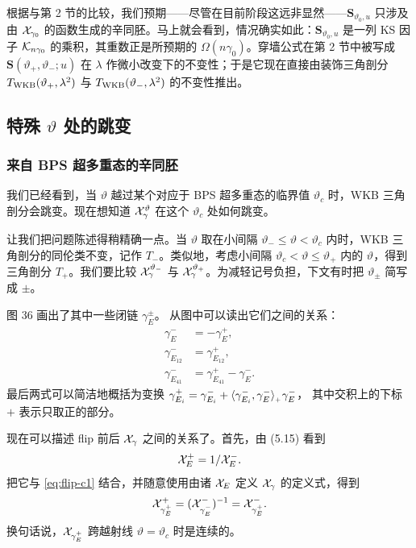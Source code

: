 根据与第 2 节的比较，我们预期——尽管在目前阶段这远非显然——$\mathbf{S}_{\vartheta_0,u}$ 只涉及由 $\mathcal{X}_{\gamma_0}$ 的函数生成的辛同胚。马上就会看到，情况确实如此：$\mathbf{S}_{\vartheta_0,u}$ 是一列 KS 因子 $\mathcal{K}_{n\gamma_0}$ 的乘积，其重数正是所预期的 $\Omega(n\gamma_0)$。穿墙公式在第 2 节中被写成 $\mathbf{S}(\vartheta_+,\vartheta_-;u)$ 在 $\lambda$ 作微小改变下的不变性；于是它现在直接由装饰三角剖分 $T_{\rm WKB}(\vartheta_+,\lambda^2)$ 与 $T_{\rm WKB}(\vartheta_-,\lambda^2)$ 的不变性推出。

\subsection{特殊 $\vartheta$ 处的跳变}

\subsubsection{来自 BPS 超多重态的辛同胚}

我们已经看到，当 $\vartheta$ 越过某个对应于 BPS 超多重态的临界值 $\vartheta_c$ 时，WKB 三角剖分会跳变。现在想知道 $\mathcal{X}^\vartheta_\gamma$ 在这个 $\vartheta_c$ 处如何跳变。

让我们把问题陈述得稍精确一点。当 $\vartheta$ 取在小间隔 $\vartheta_-\le\vartheta<\vartheta_c$ 内时，WKB 三角剖分的同伦类不变，记作 $T_-$。类似地，考虑小间隔 $\vartheta_c<\vartheta\le\vartheta_+$ 内的 $\vartheta$，得到三角剖分 $T_+$。我们要比较 $\mathcal{X}^{\vartheta_-}_\gamma$ 与 $\mathcal{X}^{\vartheta_+}_\gamma$。为减轻记号负担，下文有时把 $\vartheta_\pm$ 简写成 $\pm$。


图 36 画出了其中一些闭链 $\gamma^\pm_E$。%
从图中可以读出它们之间的关系：
%
\begin{align}
\gamma_E^{-} &= - \gamma_E^{+}, \label{eq:flip-c1} \\
\gamma_{E_{12}}^{-} &= \gamma_{E_{12}}^{+}, \label{eq:flip-c2} \\
\gamma_{E_{41}}^{-} &= \gamma_{E_{41}}^{+} - \gamma_E^{-}. \label{eq:flip-c3}
\end{align}
%
最后两式可以简洁地概括为变换
$\gamma_{E_i}^+ = \gamma_{E_i}^- + \langle \gamma_{E_i}^-, \gamma_E^- \rangle_{{}_+} \gamma_E^-$，
其中交积上的下标 $+$ 表示只取正的部分。

现在可以描述 flip 前后 $\mathcal{X}_\gamma$ 之间的关系了。首先，由 (5.15)%
看到
\begin{equation}
\mathcal{X}^+_E = 1/\mathcal{X}^-_E.
\end{equation}
把它与 \eqref{eq:flip-c1} 结合，并随意使用由诸 $\mathcal{X}_E$ 定义 $\mathcal{X}_\gamma$ 的定义式，得到
\begin{equation}
\mathcal{X}^+_{\gamma_E^+} = (\mathcal{X}^-_{\gamma_E^-})^{-1} = \mathcal{X}^-_{\gamma_E^+}.
\end{equation}
换句话说，$\mathcal{X}_{\gamma_E^+}$ 跨越射线 $\vartheta=\vartheta_c$ 时是连续的。

